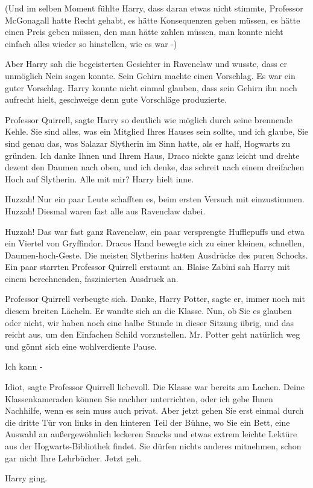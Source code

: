 (Und im selben Moment fühlte Harry, dass daran etwas nicht stimmte, Professor
McGonagall hatte Recht gehabt, es hätte Konsequenzen geben müssen, es hätte
einen Preis geben müssen, den man hätte zahlen müssen, man konnte nicht einfach
alles wieder so hinstellen, wie es war -)

Aber Harry sah die begeisterten Gesichter in Ravenclaw und wusste, dass er
unmöglich Nein sagen konnte. Sein Gehirn machte einen Vorschlag. Es war ein
guter Vorschlag. Harry konnte nicht einmal glauben, dass sein Gehirn ihn noch
aufrecht hielt, geschweige denn gute Vorschläge produzierte.

\glqq{}Professor Quirrell\grqq{}, sagte Harry so deutlich wie möglich durch seine
brennende Kehle. \glqq{}Sie sind alles, was ein Mitglied Ihres Hauses sein
sollte, und ich glaube, Sie sind genau das, was Salazar Slytherin im Sinn hatte,
als er half, Hogwarts zu gründen. Ich danke Ihnen und Ihrem Haus\grqq{}, Draco
nickte ganz leicht und drehte dezent den Daumen nach oben, \glqq{}und ich denke,
das schreit nach einem dreifachen Hoch auf Slytherin. Alle mit mir?\grqq{} Harry
hielt inne.

\glqq{}Huzzah!\grqq{} Nur ein paar Leute schafften es, beim ersten Versuch mit
einzustimmen. \glqq{}Huzzah!\grqq{} Diesmal waren fast alle aus Ravenclaw dabei.

\glqq{}Huzzah!\grqq{} Das war fast ganz Ravenclaw, ein paar versprengte
Hufflepuffs und etwa ein Viertel von Gryffindor. Dracos Hand bewegte sich zu
einer kleinen, schnellen, Daumen-hoch-Geste. Die meisten Slytherins hatten
Ausdrücke des puren Schocks. Ein paar starrten Professor Quirrell erstaunt an.
Blaise Zabini sah Harry mit einem berechnenden, faszinierten Ausdruck an.

Professor Quirrell verbeugte sich. \glqq{}Danke, Harry Potter\grqq{}, sagte er,
immer noch mit diesem breiten Lächeln. Er wandte sich an die Klasse. \glqq{}Nun,
ob Sie es glauben oder nicht, wir haben noch eine halbe Stunde in dieser Sitzung
übrig, und das reicht aus, um den Einfachen Schild vorzustellen. Mr. Potter geht
natürlich weg und gönnt sich eine wohlverdiente Pause.\grqq{}

\glqq{}Ich kann -\grqq{}

\glqq{}Idiot\grqq{}, sagte Professor Quirrell liebevoll. Die Klasse war bereits
am Lachen. \glqq{}Deine Klassenkameraden können Sie nachher unterrichten, oder
ich gebe Ihnen Nachhilfe, wenn es sein muss auch privat. Aber jetzt gehen Sie
erst einmal durch die dritte Tür von links in den hinteren Teil der Bühne, wo
Sie ein Bett, eine Auswahl an außergewöhnlich leckeren Snacks und etwas extrem
leichte Lektüre aus der Hogwarts-Bibliothek findet. Sie dürfen nichts anderes
mitnehmen, schon gar nicht Ihre Lehrbücher. Jetzt geh.\grqq{}

Harry ging.
